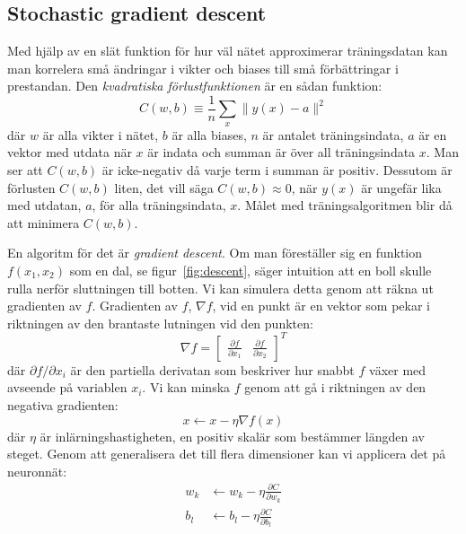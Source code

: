 \subsection{Stochastic gradient descent}
\label{sec:sdg}
Med hjälp av en slät funktion för hur väl nätet approximerar träningsdatan
kan man korrelera små ändringar i vikter och biases
till små förbättringar i prestandan.
Den \emph{kvadratiska förlustfunktionen} är en sådan funktion:
\begin{equation} \label{eq:cost}
	C(w, b) \equiv \frac{1}{n} \displaystyle\sum_x \lVert y(x) - a \rVert^2
\end{equation}
där $ w $ är alla vikter i nätet, $ b $ är alla biases,
$ n $ är antalet träningsindata, $ a $ är en vektor med utdata när $ x $ är indata
och summan är över all träningsindata $ x $.
Man ser att $ C(w, b) $ är icke-negativ då varje term i summan är positiv.
Dessutom är förlusten $ C(w, b) $ liten, det vill säga $ C(w, b) \approx 0 $,
när $ y(x) $ är ungefär lika med utdatan, $ a $, för alla träningsindata, $ x $.
Målet med träningsalgoritmen blir då att minimera $ C(w, b) $.

En algoritm för det är \emph{gradient descent}.
Om man föreställer sig en funktion $ f(x_1, x_2) $ som en dal,
se figur~\ref{fig:descent},
säger intuition att en boll skulle rulla nerför sluttningen till botten.
Vi kan simulera detta genom att räkna ut gradienten av $ f $.
Gradienten av $ f $, $ \nabla f $, vid en punkt är en vektor
som pekar i riktningen av den brantaste lutningen vid den punkten:
\begin{equation}
	\nabla f = \begin{bmatrix} \frac{\partial f}{\partial x_1} & \frac{\partial f}{\partial x_2} \end{bmatrix}^{T}
\end{equation}
där $ \partial f / \partial x_i $ är den partiella derivatan
som beskriver hur snabbt $ f $ växer med avseende på variablen $ x_i $.
Vi kan minska $ f $ genom att gå i riktningen av den negativa gradienten:
\begin{equation}
	x \leftarrow x - \eta \nabla f(x)
\end{equation}
där $ \eta $ är inlärningshastigheten,
en positiv skalär som bestämmer längden av steget.
Genom att generalisera det till flera dimensioner kan vi
applicera det på neuronnät:
\begin{align}
	w_k &\leftarrow w_k - \eta \frac{\partial C}{\partial w_k} \\
	b_l &\leftarrow b_l - \eta \frac{\partial C}{\partial b_l}
\end{align}

